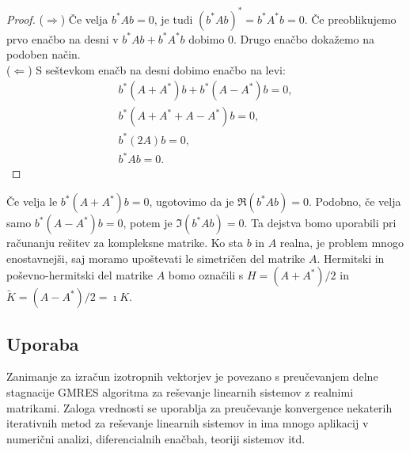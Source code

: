 \documentclass[12pt,a4paper]{amsart}
\theoremstyle{definition}
\theoremstyle{plain}
\begin{document}
\begin{proof}
($\Rightarrow$) Če velja $b^\ast Ab=0$, je tudi $(b^\ast Ab)^\ast=b^\ast A^\ast b=0$. Če preoblikujemo prvo enačbo na desni v $b^\ast Ab +b^\ast A^\ast b$ dobimo 0. Drugo enačbo dokažemo na podoben način.\\
($\Leftarrow$) S seštevkom enačb na desni dobimo enačbo na levi:
\begin{align*}
 b^\ast (A+A^\ast)b+b^\ast(A-A^\ast)b=0,\\
b^\ast (A+A^\ast+A-A^\ast)b=0,\\
b^\ast (2A)b=0,\\
b^\ast Ab=0.
\end{align*}
\end{proof}

Če velja le $b^\ast (A+A^\ast)b=0$, ugotovimo da je $\Re(b^\ast Ab)=0$. Podobno, če velja samo $b^\ast(A-A^\ast)b=0$, potem je $\Im(b^\ast Ab)=0$. Ta dejstva bomo uporabili pri računanju rešitev za kompleksne matrike. 
Ko sta $b$ in $A$ realna, je problem mnogo enostavnejši, saj moramo upoštevati le simetričen del matrike $A$.
Hermitski in poševno-hermitski del matrike $A$ bomo označili s $H=(A+A^\ast)/2$ in $\tilde{K}=(A-A^\ast)/2=\imath K$.

\subsection{Uporaba}
Zanimanje za izračun izotropnih vektorjev je povezano s pre\-u\-če\-va\-njem delne stagnacije GMRES algoritma za reševanje linearnih sistemov z realnimi matrikami. Zaloga vrednosti se uporablja za preučevanje konvergence nekaterih iterativnih metod za reševanje linearnih sistemov in ima mnogo aplikacij v numerični analizi, diferencialnih enačbah, teoriji sistemov itd.

\end{document}
